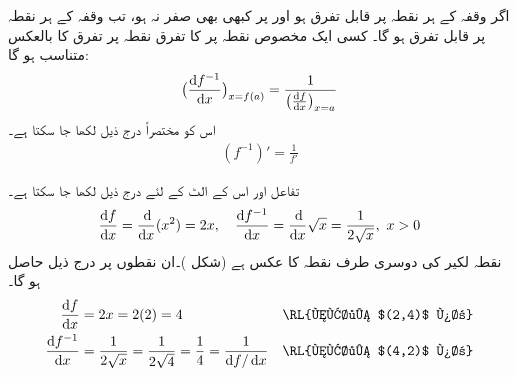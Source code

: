 اگر وقفہ  کے ہر نقطہ پر  قابل تفرق ہو اور  پر  کبھی بھی صفر  نہ ہو، تب وقفہ  کے ہر نقطہ پر  قابل تفرق ہو گا۔ کسی ایک مخصوص نقطہ  پر  کا تفرق نقطہ  پر تفرق  کا بالعکس متناسب ہو گا:
\begin{align}\label{مساوات_ماورائی_قاعدہ_الٹ_تفرق_الف}
\big(\frac{\dif f^{-1}}{\dif x}\big)_{x=f(a)}=\frac{1}{\big(\frac{\dif f}{\dif x}\big)_{x=a}}
\end{align}
اس کو مختصراً درج ذیل لکھا جا سکتا ہے۔
\begin{align}\label{مساوات_ماورائی_قاعدہ_الٹ_تفرق_ب}
(f^{-1})'=\frac{1}{f'}
\end{align}

تفاعل  اور اس کے الٹ  کے لئے درج ذیل لکھا جا سکتا ہے۔
\begin{align*}
\frac{\dif f}{\dif x}=\frac{\dif}{\dif x}(x^2)=2x,\quad \frac{\dif f^{-1}}{\dif x}=\frac{\dif}{\dif x}\sqrt{x}=\frac{1}{2\sqrt{x}},\,\,x>0
\end{align*}
نقطہ  لکیر  کی دوسری طرف نقطہ  کا عکس ہے (شکل )۔ان نقطوں پر درج ذیل حاصل ہو گا۔
\begin{align*}
\frac{\dif f}{\dif x}&=2x=2(2)=4&&\text{\RL{نقطہ $(2,4)$ پر}}\\
\frac{\dif f^{-1}}{\dif x}&=\frac{1}{2\sqrt{x}}=\frac{1}{2\sqrt{4}}=\frac{1}{4}=\frac{1}{\dif f/\dif x}&&\text{\RL{نقطہ $(4,2)$ پر}}
\end{align*}

